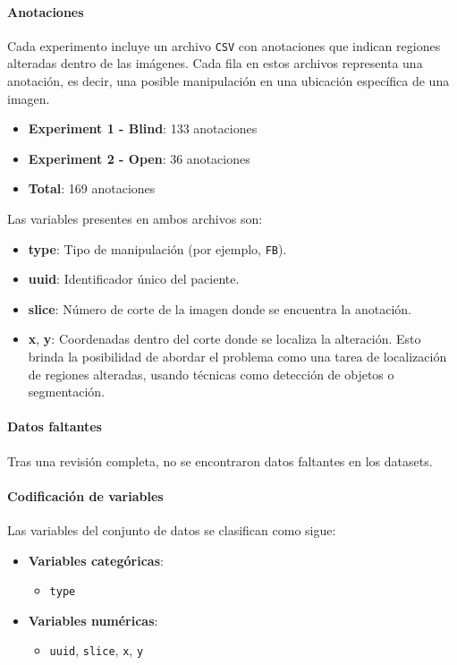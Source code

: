 \documentclass[conference]{IEEEtran}
\begin{document}
\paragraph{Anotaciones}
Cada experimento incluye un archivo \texttt{CSV} con anotaciones que indican regiones alteradas dentro de las imágenes. Cada fila en estos archivos representa una anotación, es decir, una posible manipulación en una ubicación específica de una imagen.

\begin{itemize}
    \item \textbf{Experiment 1 - Blind}: 133 anotaciones
    \item \textbf{Experiment 2 - Open}: 36 anotaciones
    \item \textbf{Total}: 169 anotaciones
\end{itemize}

Las variables presentes en ambos archivos son:

\begin{itemize}
    \item \textbf{type}: Tipo de manipulación (por ejemplo, \texttt{FB}).
    \item \textbf{uuid}: Identificador único del paciente.
    \item \textbf{slice}: Número de corte de la imagen donde se encuentra la anotación.
    \item \textbf{x}, \textbf{y}: Coordenadas dentro del corte donde se localiza la alteración. Esto brinda la posibilidad de abordar el problema como una tarea de localización de regiones alteradas, usando técnicas como detección de objetos o segmentación.
\end{itemize}


\paragraph{Datos faltantes}
Tras una revisión completa, no se encontraron datos faltantes en los datasets. 

\paragraph{Codificación de variables}

Las variables del conjunto de datos se clasifican como sigue:

\begin{itemize}
    \item \textbf{Variables categóricas}:
        \begin{itemize}
            \item \texttt{type}
        \end{itemize}
    \item \textbf{Variables numéricas}:
        \begin{itemize}
            \item \texttt{uuid}, \texttt{slice}, \texttt{x}, \texttt{y}
        \end{itemize}
\end{itemize}
\end{document}
